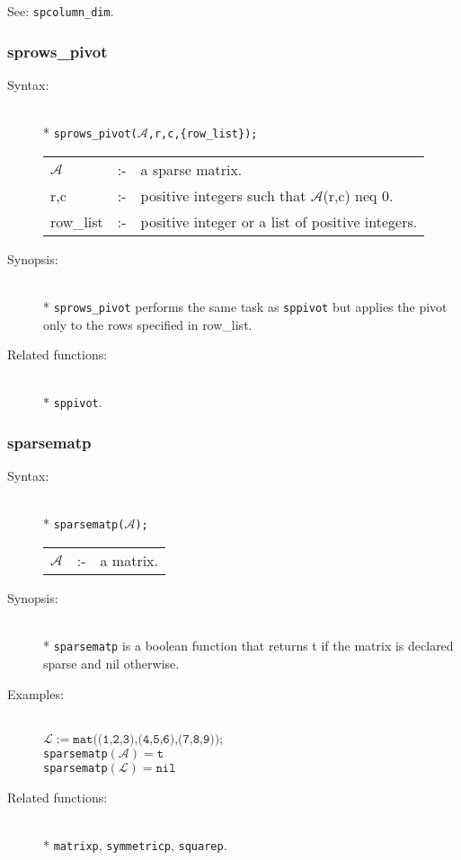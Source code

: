 See: \texttt{spcolumn\_dim}.


\subsubsection{sprows\_pivot}
\label{sparse:sprows_pivot}

\begin{description}
\item[Syntax:]\mbox{}\\*
\texttt{sprows\_pivot($\mathcal{A}$,r,c,\{row\_list\});}\\[2mm]
\begin{tabular}{l l l}
$\mathcal{A}$ &:-& a sparse matrix. \\
r,c        &:-& positive integers such that $\mathcal{A}$(r,c) neq 0.\\
row\_list  &:-& positive integer or a list of positive integers.
\end{tabular}

\item[Synopsis:]\mbox{}\\*
\texttt{sprows\_pivot} performs the same task as \texttt{sppivot} but applies
the pivot only to the rows specified in row\_list.

\item[Related functions:]\mbox{}\\*
\texttt{sppivot}.
\end{description}

\subsubsection{sparsematp}
\label{sparse:sparsematp}

\begin{description}
\item[Syntax:]\mbox{}\\*
\texttt{sparsematp($\mathcal{A}$);}\\[2mm]
\begin{tabular}{l l l}
$\mathcal{A}$ &:-& a matrix.
\end{tabular}

\item[Synopsis:]\mbox{}\\*
\texttt{sparsematp} is a boolean function that returns t if
                the matrix is declared sparse and nil otherwise.

\item[Examples:]\mbox{}\\
\(\mathcal{L} := \texttt{mat((1,2,3),(4,5,6),(7,8,9));}\) \\[2mm]
\texttt{sparsematp}\((\mathcal{A}) = \texttt{t}\) \\[2mm]
\texttt{sparsematp}\((\mathcal{L}) = \texttt{nil}\)

\item[Related functions:]\mbox{}\\*
\texttt{matrixp}, \texttt{symmetricp}, \texttt{squarep}.
\end{description}

